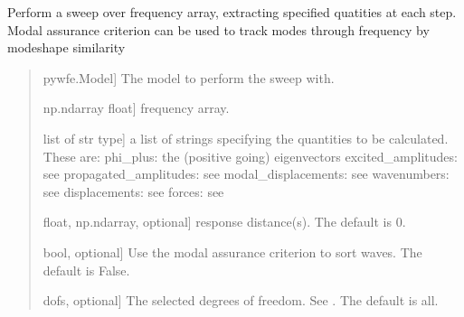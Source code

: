 \documentclass[letterpaper,10pt,english]{sphinxmanual}
\begin{document}
\begin{fulllineitems}
\label{\detokenize{utils:pywfe.utils.frequency_sweep.frequency_sweep}}
\pysigstartsignatures
{}
\pysigstopsignatures
\sphinxAtStartPar
Perform a sweep over frequency array, extracting specified quatities
at each step. Modal assurance criterion can be used to track modes through
frequency by modeshape similarity
\begin{quote}\begin{description}
\begin{description}
\sphinxlineitem{\sphinxstylestrong{model}}{[}pywfe.Model{]}
\sphinxAtStartPar
The model to perform the sweep with.

\sphinxlineitem{\sphinxstylestrong{f\_arr}}{[}np.ndarray float{]}
\sphinxAtStartPar
frequency array.

\sphinxlineitem{\sphinxstylestrong{quantities}}{[}list of str type{]}
\sphinxAtStartPar
a list of strings specifying the quantities to be calculated.
These are:
\sphinxhyphen{} phi\_plus: the (positive going) eigenvectors
\sphinxhyphen{} excited\_amplitudes: see 
\sphinxhyphen{} propagated\_amplitudes: see 
\sphinxhyphen{} modal\_displacements: see 
\sphinxhyphen{} wavenumbers: see 
\sphinxhyphen{} displacements: see 
\sphinxhyphen{} forces: see 

\sphinxlineitem{\sphinxstylestrong{x\_r}}{[}float, np.ndarray, optional{]}
\sphinxAtStartPar
response distance(s). The default is 0.

\sphinxlineitem{\sphinxstylestrong{mac}}{[}bool, optional{]}
\sphinxAtStartPar
Use the modal assurance criterion to sort waves. The default is False.

\sphinxlineitem{\sphinxstylestrong{dofs}}{[}dofs, optional{]}
\sphinxAtStartPar
The selected degrees of freedom. See .
The default is \textquotesingle{}all\textquotesingle{}.


\end{description}
\end{description}
\end{quote}
\end{fulllineitems}
\end{document}
